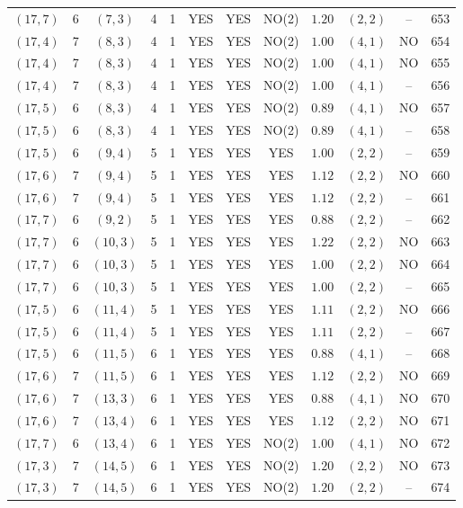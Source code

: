 \begin{longtable}{|c|c|c|c|c|c|c|c|c|c|c|c|}
$(17,7)$ & 6 & $(7,3)$ & 4 & 1 & YES & YES & NO(2) & $1.20$ & $(2,2)$ & -- & 653\\
$(17,4)$ & 7 & $(8,3)$ & 4 & 1 & YES & YES & NO(2) & $1.00$ & $(4,1)$ & NO & 654\\
$(17,4)$ & 7 & $(8,3)$ & 4 & 1 & YES & YES & NO(2) & $1.00$ & $(4,1)$ & NO & 655\\
$(17,4)$ & 7 & $(8,3)$ & 4 & 1 & YES & YES & NO(2) & $1.00$ & $(4,1)$ & -- & 656\\
$(17,5)$ & 6 & $(8,3)$ & 4 & 1 & YES & YES & NO(2) & $0.89$ & $(4,1)$ & NO & 657\\
$(17,5)$ & 6 & $(8,3)$ & 4 & 1 & YES & YES & NO(2) & $0.89$ & $(4,1)$ & -- & 658\\
$(17,5)$ & 6 & $(9,4)$ & 5 & 1 & YES & YES & YES & $1.00$ & $(2,2)$ & -- & 659\\
$(17,6)$ & 7 & $(9,4)$ & 5 & 1 & YES & YES & YES & $1.12$ & $(2,2)$ & NO & 660\\
$(17,6)$ & 7 & $(9,4)$ & 5 & 1 & YES & YES & YES & $1.12$ & $(2,2)$ & -- & 661\\
$(17,7)$ & 6 & $(9,2)$ & 5 & 1 & YES & YES & YES & $0.88$ & $(2,2)$ & -- & 662\\
$(17,7)$ & 6 & $(10,3)$ & 5 & 1 & YES & YES & YES & $1.22$ & $(2,2)$ & NO & 663\\
$(17,7)$ & 6 & $(10,3)$ & 5 & 1 & YES & YES & YES & $1.00$ & $(2,2)$ & NO & 664\\
$(17,7)$ & 6 & $(10,3)$ & 5 & 1 & YES & YES & YES & $1.00$ & $(2,2)$ & -- & 665\\
$(17,5)$ & 6 & $(11,4)$ & 5 & 1 & YES & YES & YES & $1.11$ & $(2,2)$ & NO & 666\\
$(17,5)$ & 6 & $(11,4)$ & 5 & 1 & YES & YES & YES & $1.11$ & $(2,2)$ & -- & 667\\
$(17,5)$ & 6 & $(11,5)$ & 6 & 1 & YES & YES & YES & $0.88$ & $(4,1)$ & -- & 668\\
$(17,6)$ & 7 & $(11,5)$ & 6 & 1 & YES & YES & YES & $1.12$ & $(2,2)$ & NO & 669\\
$(17,6)$ & 7 & $(13,3)$ & 6 & 1 & YES & YES & YES & $0.88$ & $(4,1)$ & NO & 670\\
$(17,6)$ & 7 & $(13,4)$ & 6 & 1 & YES & YES & YES & $1.12$ & $(2,2)$ & NO & 671\\
$(17,7)$ & 6 & $(13,4)$ & 6 & 1 & YES & YES & NO(2) & $1.00$ & $(4,1)$ & NO & 672\\
$(17,3)$ & 7 & $(14,5)$ & 6 & 1 & YES & YES & NO(2) & $1.20$ & $(2,2)$ & NO & 673\\
$(17,3)$ & 7 & $(14,5)$ & 6 & 1 & YES & YES & NO(2) & $1.20$ & $(2,2)$ & -- & 674\\

\end{longtable}
